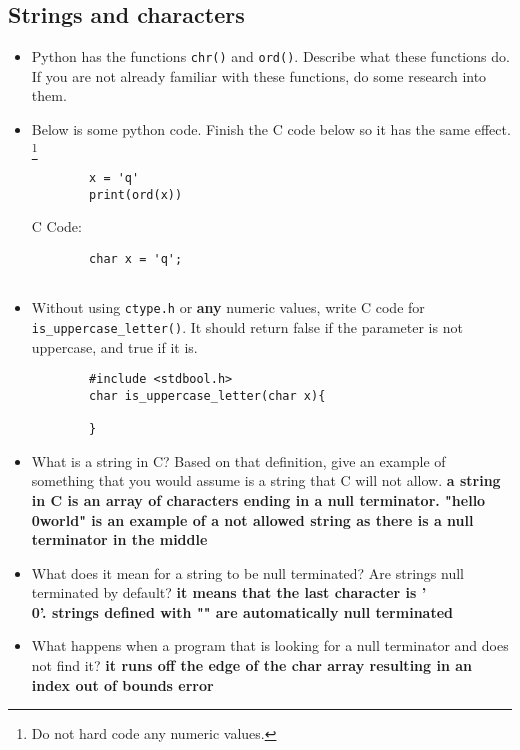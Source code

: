 \documentclass{article}
\begin{document}
\subsection{Strings and characters}
\begin{itemize}
    \item Python has the functions \texttt{chr()} and \texttt{ord()}. Describe what these functions do. If you are not already familiar with these functions, do some research into them. 
    \item Below is some python code. Finish the C code below so it has the same effect. \footnote{Do not hard code any numeric values.}
    \begin{lstlisting}
        x = 'q'
        print(ord(x))
    \end{lstlisting}
    C Code:
    \begin{lstlisting}
        char x = 'q';
        
    \end{lstlisting}
    \item Without using \texttt{ctype.h} or \textbf{any} numeric values, write C code for \texttt{is_uppercase_letter()}. It should return false if the parameter is not uppercase, and true if it is. 
    \begin{lstlisting}
        #include <stdbool.h>
        char is_uppercase_letter(char x){
            
        }
    \end{lstlisting}
    
    \item What is a string in C? Based on that definition, give an example of something that you would assume is a string that C will not allow. \textbf{a string in C is an array of characters ending in a null terminator. "hello\\0world" is an example of a not allowed string as there is a null terminator in the middle}
    \item What does it mean for a string to be null terminated? Are strings null terminated by default? \textbf{it means that the last character is '\\0'. strings defined with "" are automatically null terminated}
    \item What happens when a program that is looking for a null terminator and does not find it? \textbf{it runs off the edge of the char array resulting in an index out of bounds error}
    
\end{itemize}
\end{document}

